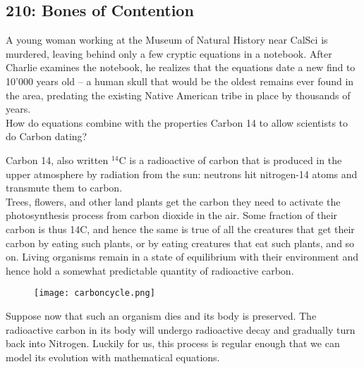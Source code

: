 \newpage
\subsection{210: Bones of Contention}\label{210}

A young woman working at the Museum of Natural History near CalSci is murdered, leaving behind only a few cryptic equations in a notebook. After Charlie examines the notebook, he realizes that the equations date a new find to 10'000 years old -- a human skull that would be the oldest remains ever found in the area, predating the existing Native American tribe in place by thousands of years. \\

How do equations combine with the properties Carbon 14 to allow scientists to do Carbon dating? \\


Carbon 14, also written $^{14}$C is a radioactive  of carbon that is produced in the upper atmosphere by radiation from the sun: neutrons hit nitrogen-14 atoms and transmute them to carbon. \\

Trees, flowers, and other land plants get the carbon they need to activate the photosynthesis process from carbon dioxide in the air. Some fraction of their carbon is thus 14C, and hence the same is true of all the creatures that get their carbon by eating such plants, or by eating creatures that eat such plants, and so on. Living organisms remain in a state of equilibrium with their environment and hence hold a somewhat predictable quantity of radioactive carbon. \\

\begin{figure}[H]
   \centering
   \texttt{[image: carboncycle.png]} 
\end{figure}

Suppose now that such an organism dies and its body is preserved. The radioactive carbon in its body will undergo radioactive decay and gradually turn back into Nitrogen. Luckily for us, this process is regular enough that we can model its evolution with mathematical equations. \\

